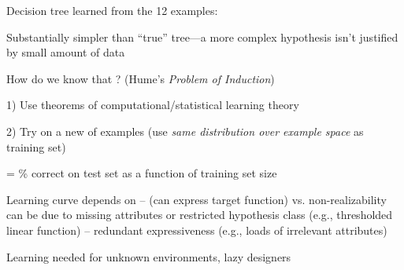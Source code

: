 \documentclass{article}
\begin{document}
\begin{huge}

Decision tree learned from the 12 examples:

\vspace*{0.2in}

\textwidth
{}

Substantially simpler than ``true'' tree---a more complex hypothesis
isn't justified by small amount of data




How do we know that ? (Hume's \emph{Problem of Induction})

1) Use theorems of computational/statistical learning theory

2) Try  on a new  of examples \al
  (use \emph{same distribution over example space} as training set)

 = \% correct on test set as a function of training set size

\vspace*{-0.2in}

\textwidth
{}








Learning curve depends on\al
 --  (can express target function) vs. \nl
     non-realizability can be due to missing attributes \nl
     or restricted hypothesis class (e.g., thresholded linear function)\al
 -- redundant expressiveness (e.g., loads of irrelevant attributes)

\vspace*{0.2in}

\textwidth
{}




Learning needed for unknown environments, lazy designers


\end{huge}
\end{document}
